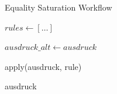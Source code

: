 \begin{algorithm}[H]
  \caption{Equality Saturation Workflow}\label{alg:eqsat}
  \begin{algorithmic}
    \State $rules \gets [\ldots]$
    
      \State $ausdruck\_alt \gets ausdruck$

        \State apply(ausdruck, rule)
        \EndIf
      \EndFor
    \EndWhile

    \State \Return ausdruck
    \EndFunction
  \end{algorithmic}
\end{algorithm}
